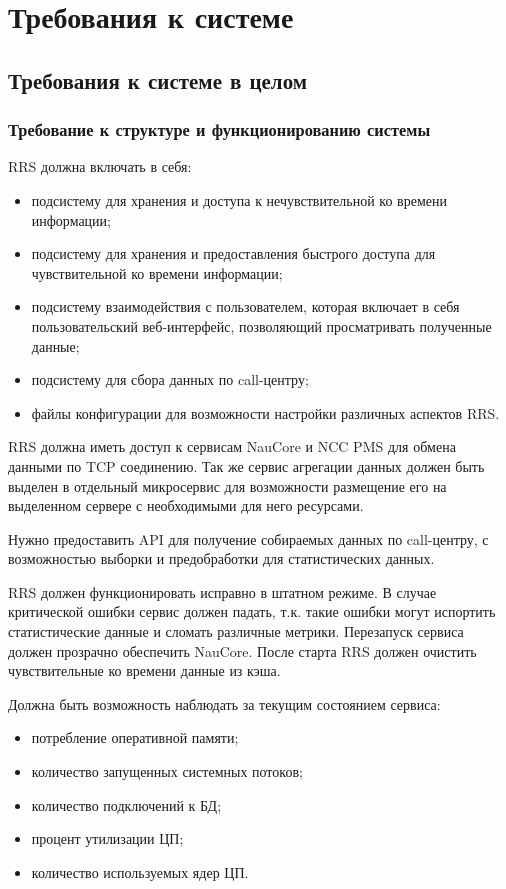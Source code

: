 \section{Требования к системе}

\subsection{Требования к системе в целом}

\subsubsection{Требование к структуре и функционированию системы}

RRS должна включать в себя:
\begin{itemize}
    \item подсистему для хранения и доступа к нечувствительной ко времени информации;
    \item подсистему для хранения и предоставления быстрого доступа для чувствительной ко времени информации;
    \item подсистему взаимодействия с пользователем, которая включает в себя пользовательский веб-интерфейс, позволяющий просматривать полученные данные;
    \item подсистему для сбора данных по call-центру;
    \item файлы конфигурации для возможности настройки различных аспектов RRS\@.
\end{itemize}

RRS должна иметь доступ к сервисам NauCore и NCC PMS для обмена данными по TCP соединению.
Так же сервис агрегации данных должен быть выделен в отдельный микросервис для возможности размещение его на выделенном сервере с необходимыми для него ресурсами.

Нужно предоставить API для получение собираемых данных по call-центру,
с возможностью выборки и предобработки для статистических данных.

RRS должен функционировать исправно в штатном режиме.
В случае критической ошибки сервис должен падать,
т.к. такие ошибки могут испортить статистические данные и сломать различные метрики.
Перезапуск сервиса должен прозрачно обеспечить NauCore.
После старта RRS должен очистить чувствительные ко времени данные из кэша.

Должна быть возможность наблюдать за текущим состоянием сервиса:
\begin{itemize}
    \item потребление оперативной памяти;
    \item количество запущенных системных потоков;
    \item количество подключений к БД;
    \item процент утилизации ЦП;
    \item количество используемых ядер ЦП.
\end{itemize}

